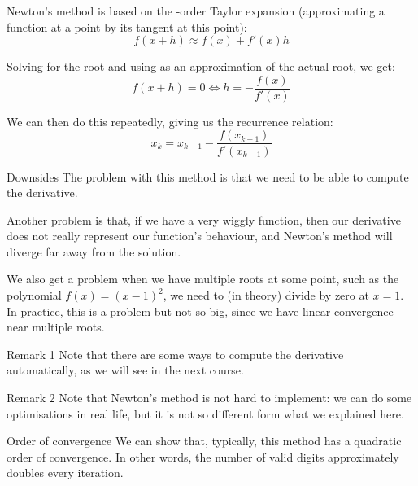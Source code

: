 \documentclass[a4paper]{article}
\begin{document}
\begin{parag}{Newton's method}
     is based on the -order Taylor expansion (approximating a function at a point by its tangent at this point): 
    \[f\left(x + h\right) \approx f\left(x\right) + f'\left(x\right)h\]

    Solving for the root and using as an approximation of the actual root, we get: 
    \[f\left(x + h\right) = 0 \iff h = -\frac{f\left(x\right)}{f'\left(x\right)}\]

    We can then do this repeatedly, giving us the recurrence relation: 
    \[x_k = x_{k-1} - \frac{f\left(x_{k-1}\right)}{f'\left(x_{k-1}\right)}\]
    

    \begin{subparag}{Downsides}
        The problem with this method is that we need to be able to compute the derivative.

        Another problem is that, if we have a very wiggly function, then our derivative does not really represent our function's behaviour, and Newton's method will diverge far away from the solution.

        We also get a problem when we have multiple roots at some point, such as the polynomial $f\left(x\right) = \left(x - 1\right)^2$, we need to (in theory) divide by zero at $x = 1$. In practice, this is a problem but not so big, since we have linear convergence near multiple roots.
    \end{subparag}

    \begin{subparag}{Remark 1}
        Note that there are some ways to compute the derivative automatically, as we will see in the next course.
    \end{subparag}

    \begin{subparag}{Remark 2}
        Note that Newton's method is not hard to implement: we can do some optimisations in real life, but it is not so different form what we explained here.
    \end{subparag}

    \begin{subparag}{Order of convergence}
        We can show that, typically, this method has a quadratic order of convergence. In other words, the number of valid digits approximately doubles every  iteration.
    \end{subparag}
\end{parag}
\end{document}
